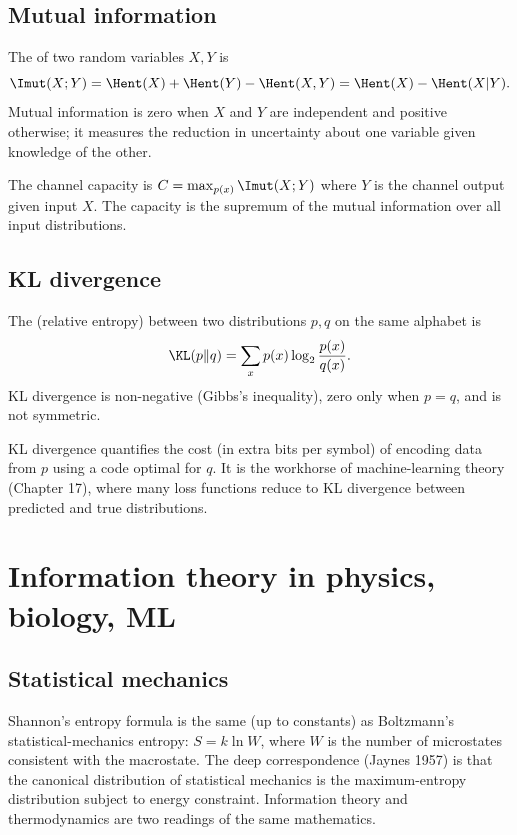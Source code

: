 \subsection{Mutual information}

The  of two random variables $X, Y$ is
\[
\Imut(X; Y) = \Hent(X) + \Hent(Y) - \Hent(X, Y) = \Hent(X) - \Hent(X|Y).
\]
Mutual information is zero when $X$ and $Y$ are independent and positive otherwise; it measures the reduction in uncertainty about one variable given knowledge of the other.

The channel capacity is $C = \max_{p(x)} \Imut(X; Y)$ where $Y$ is the channel output given input $X$. The capacity is the supremum of the mutual information over all input distributions.

\subsection{KL divergence}

The  (relative entropy) between two distributions $p, q$ on the same alphabet is
\[
\KL(p \| q) = \sum_x p(x) \log_2 \frac{p(x)}{q(x)}.
\]
KL divergence is non-negative (Gibbs's inequality), zero only when $p = q$, and is not symmetric.

KL divergence quantifies the cost (in extra bits per symbol) of encoding data from $p$ using a code optimal for $q$. It is the workhorse of machine-learning theory (Chapter 17), where many loss functions reduce to KL divergence between predicted and true distributions.

\section{Information theory in physics, biology, ML}

\subsection{Statistical mechanics}

Shannon's entropy formula is the same (up to constants) as Boltzmann's statistical-mechanics entropy: $S = k \ln W$, where $W$ is the number of microstates consistent with the macrostate. The deep correspondence (Jaynes 1957) is that the canonical distribution of statistical mechanics is the maximum-entropy distribution subject to energy constraint. Information theory and thermodynamics are two readings of the same mathematics.

